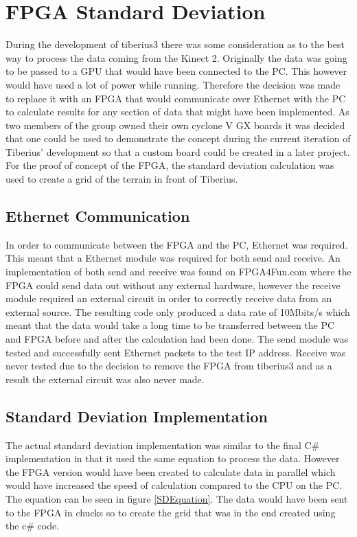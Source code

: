 \section{FPGA Standard Deviation}
During the development of \gls{tiberius3} there was some consideration as to the best way to process the data coming from the Kinect 2. Originally the data was going to be passed to a GPU that would have been connected to the PC. This however would have used a lot of power while running. Therefore the decision was made to replace it with an \gls{FPGA} that would communicate over Ethernet with the PC to calculate results for any section of data that might have been implemented. As two members of the group owned their own cyclone V GX boards \cite{CycloneV} it was decided that one could be used to demonstrate the concept during the current iteration of Tiberius' development so that a custom board could be created in a later project. For the proof of concept of the \gls{FPGA}, the standard deviation calculation was used to create a grid of the terrain in front of Tiberius.
\subsection{Ethernet Communication}
In order to communicate between the \gls{FPGA} and the PC, Ethernet was required. This meant that a Ethernet module was required for both send and receive. An implementation of both send and receive was found on FPGA4Fun.com \cite{FPGA4Fun} where the \gls{FPGA} could send data out without any external hardware, however the receive module required an external circuit in order to correctly receive data from an external source. The resulting code only produced a data rate of 10Mbits/s which meant that the data would take a long time to be transferred between the PC and \gls{FPGA} before and after the calculation had been done. The send module was tested and successfully sent Ethernet packets to the test IP address. Receive was never tested due to the decision to remove the \gls{FPGA} from \gls{tiberius3} and as a result the external circuit was also never made.
\subsection{Standard Deviation Implementation}
The actual standard deviation implementation was similar to the final C\# implementation in that it used the same equation to process the data. However the \gls{FPGA} version would have been created to calculate data in parallel which would have increased the speed of calculation compared to the CPU on the PC. The equation can be seen in figure \ref{SDEquation}. The data would have been sent to the \gls{FPGA} in chucks so to create the grid that was in the end created using the c\# code.
